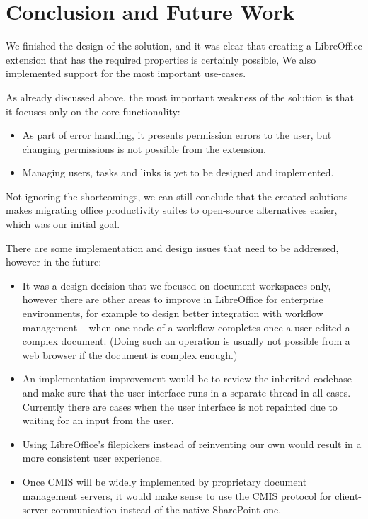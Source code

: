 \section{Conclusion and Future Work}

We finished the design of the solution, and it was clear that creating a
LibreOffice extension that has the required properties is certainly possible,
We also implemented support for the most important use-cases.

As already discussed above, the most important weakness of the solution is that
it focuses only on the core functionality:

\begin{itemize}
\item As part of error handling, it presents permission errors to the user, but
changing permissions is not possible from the extension.
\item Managing users, tasks and links is yet to be designed and implemented.
\end{itemize}

Not ignoring the shortcomings, we can still conclude that the created solutions
makes migrating office productivity suites to open-source alternatives easier,
which was our initial goal.

There are some implementation and design issues that need to be addressed,
however in the future:

\begin{itemize}
\item It was a design decision that we focused on document workspaces only,
however there are other areas to improve in LibreOffice for enterprise
environments, for example to design better integration with workflow management
-- when one node of a workflow completes once a user edited a complex document.
(Doing such an operation is usually not possible from a web browser if the
document is complex enough.)
\item An implementation improvement would be to review the inherited codebase
and make sure that the user interface runs in a separate thread in all cases.
Currently there are cases when the user interface is not repainted due to
waiting for an input from the user.
\item Using LibreOffice's filepickers instead of reinventing our own would
result in a more consistent user experience.
\item Once CMIS will be widely implemented by proprietary document management
servers, it would make sense to use the CMIS protocol for client-server
communication instead of the native SharePoint one.
\end{itemize}
